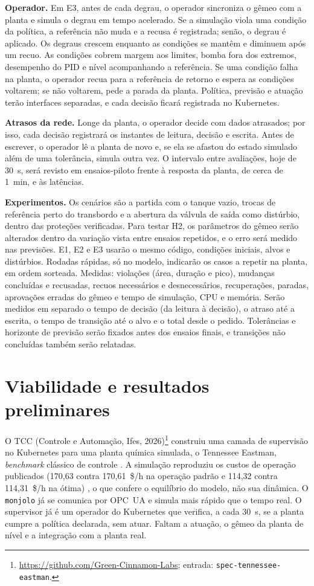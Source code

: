 \documentclass[11pt,a4paper]{article}
\begin{document}
\textbf{Operador.} Em E3, antes de cada degrau, o operador sincroniza o gêmeo com a planta e simula o degrau em tempo acelerado. Se a simulação viola uma condição da política, a referência não muda e a recusa é registrada; senão, o degrau é aplicado. Os degraus crescem enquanto as condições se mantêm e diminuem após um recuo. As condições cobrem margem aos limites, bomba fora dos extremos, desempenho do PID \cite{Bradu2018} e nível acompanhando a referência. Se uma condição falha na planta, o operador recua para a referência de retorno e espera as condições voltarem; se não voltarem, pede a parada da planta. Política, previsão e atuação terão interfaces separadas, e cada decisão ficará registrada no Kubernetes.

\textbf{Atrasos da rede.} Longe da planta, o operador decide com dados atrasados; por isso, cada decisão registrará os instantes de leitura, decisão e escrita. Antes de escrever, o operador lê a planta de novo e, se ela se afastou do estado simulado além de uma tolerância, simula outra vez. O intervalo entre avaliações, hoje de 30~s, será revisto em ensaios-piloto frente à resposta da planta, de cerca de 1~min, e às latências.

\textbf{Experimentos.} Os cenários são a partida com o tanque vazio, trocas de referência perto do transbordo e a abertura da válvula de saída como distúrbio, dentro das proteções verificadas. Para testar H2, os parâmetros do gêmeo serão alterados dentro da variação vista entre ensaios repetidos, e o erro será medido nas previsões. E1, E2 e E3 usarão o mesmo código, condições iniciais, alvos e distúrbios. Rodadas rápidas, só no modelo, indicarão os casos a repetir na planta, em ordem sorteada. Medidas: violações (área, duração e pico), mudanças concluídas e recusadas, recuos necessários e desnecessários, recuperações, paradas, aprovações erradas do gêmeo e tempo de simulação, CPU e memória. Serão medidos em separado o tempo de decisão (da leitura à decisão), o atraso até a escrita, o tempo de transição até o alvo e o total desde o pedido. Tolerâncias e horizonte de previsão serão fixados antes dos ensaios finais, e transições não concluídas também serão relatadas.

\section{Viabilidade e resultados preliminares}

O TCC (Controle e Automação, Ifes, 2026)\footnote{\url{https://github.com/Green-Cinnamon-Labs}; entrada: \texttt{spec-tennessee-eastman}.} construiu uma camada de supervisão no Kubernetes para uma planta química simulada, o Tennessee Eastman, \textit{benchmark} clássico de controle \cite{DOWNS1993}. A simulação reproduziu os custos de operação publicados (170,63 contra 170,61~\$/h na operação padrão e 114,32 contra 114,31~\$/h na ótima) \cite{Ricker1995}, o que confere o equilíbrio do modelo, não sua dinâmica. O \texttt{monjolo} já se comunica por OPC~UA e simula mais rápido que o tempo real. O supervisor já é um operador do Kubernetes que verifica, a cada 30~s, se a planta cumpre a política declarada, sem atuar. Faltam a atuação, o gêmeo da planta de nível e a integração com a planta real.
\end{document}
